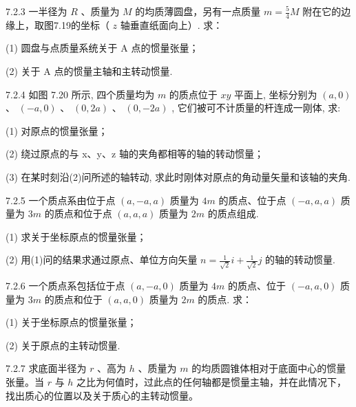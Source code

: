 \begin{problem}{7.2.3}
一半径为 $R$ 、质量为 $M$ 的均质薄圆盘，另有一点质量 $m = \frac{5}{4} M$ 附在它的边缘上，取图7.19的坐标（ $z$ 轴垂直纸面向上）. 求：

(1) 圆盘与点质量系统关于 A 点的惯量张量；

(2) 关于 A 点的惯量主轴和主转动惯量.
\begin{center}

\end{center}
\end{problem}
\clearpage


\begin{problem}{7.2.4}
如图 7.20 所示, 四个质量均为 $m$ 的质点位于 $xy$ 平面上, 坐标分别为 $(a,0)$ 、 $(-a,0)$ 、 $(0,2a)$ 、 $(0,-2a)$ , 它们被可不计质量的杆连成一刚体, 求:

(1) 对原点的惯量张量；

(2) 绕过原点的与 x、y、z 轴的夹角都相等的轴的转动惯量；

(3) 在某时刻沿(2)问所述的轴转动, 求此时刚体对原点的角动量矢量和该轴的夹角.
\begin{center}

\end{center}
\end{problem}
\clearpage


\begin{problem}{7.2.5}
一个质点系由位于点 $(a, -a, a)$ 质量为 $4m$ 的质点、位于点 $(-a, a, a)$ 质量为 $3m$ 的质点和位于点 $(a, a, a)$ 质量为 $2m$ 的质点组成.

(1) 求关于坐标原点的惯量张量；

(2) 用(1)问的结果求通过原点、单位方向矢量 $n = \frac{1}{\sqrt{2}} i + \frac{1}{\sqrt{2}} j$ 的轴的转动惯量.
\end{problem}
\clearpage


\begin{problem}{7.2.6}
一个质点系包括位于点 $(a, -a, 0)$ 质量为 $4m$ 的质点、位于 $(-a, a, 0)$ 质量为 $3m$ 的质点和位于 $(a, a, 0)$ 质量为 $2m$ 的质点. 求：

(1) 关于坐标原点的惯量张量；

(2) 关于原点的主转动惯量.
\end{problem}
\clearpage


\begin{problem}{7.2.7}
求底面半径为 $r$ 、高为 $h$ 、质量为 $m$ 的均质圆锥体相对于底面中心的惯量张量。当 $r$ 与 $h$ 之比为何值时，过此点的任何轴都是惯量主轴，并在此情况下，找出质心的位置以及关于质心的主转动惯量。
\end{problem}
\clearpage


